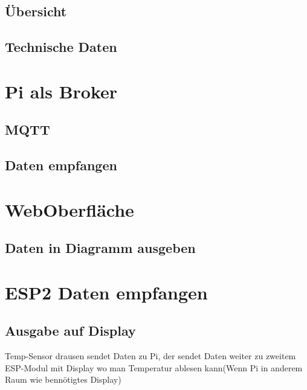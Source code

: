 \documentclass[paper=a4, 12pt]{scrreprt}
\begin{document}
\section{Übersicht}
\section{Technische Daten}
\chapter{Pi als Broker}
\section{MQTT}
\section{Daten empfangen}
\chapter{WebOberfläche}
\section{Daten in Diagramm ausgeben}

\chapter{ESP2 Daten empfangen}
\section{Ausgabe auf Display}
Temp-Sensor drausen sendet Daten zu Pi, der sendet Daten weiter zu zweitem ESP-Modul mit Display wo man Temperatur ablesen kann(Wenn Pi in anderem Raum wie bennötigtes Display)
\end{document}
